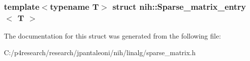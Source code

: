 \subsubsection*{template$<$typename T$>$ struct nih\-::\-Sparse\-\_\-matrix\-\_\-entry$<$ T $>$}



\-The documentation for this struct was generated from the following file\-:\begin{DoxyCompactItemize}
\item 
\-C\-:/p4research/research/jpantaleoni/nih/linalg/sparse\-\_\-matrix.\-h\end{DoxyCompactItemize}
